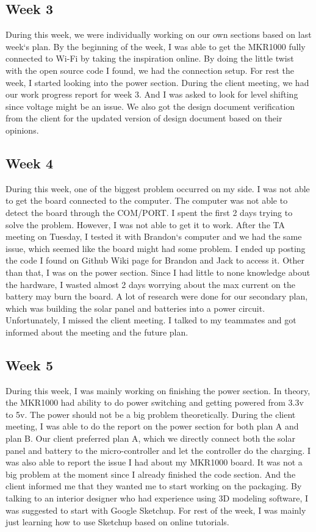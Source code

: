 \documentclass[IEEEtran,letterpaper,10pt,titlepage,fleqn,draftclsnofoot,onecolumn]{article}
\begin{document}
\subsection{Week 3}

During this week, we were individually working on our own sections based on last week`s plan. By the beginning of the week, I was able to get the MKR1000 fully connected to Wi-Fi by taking the inspiration online. By doing the little twist with the open source code I found, we had the connection setup. For rest the week, I started looking into the power section. During the client meeting, we had our work progress report for week 3. And I was asked to look for level shifting since voltage might be an issue.  We also got the design document verification from the client for the updated version of design document based on their opinions.

\subsection{Week 4}

During this week, one of the biggest problem occurred on my side. I was not able to get the board connected to the computer. The computer was not able to detect the board through the COM/PORT. I spent the first 2 days trying to solve the problem. However, I was not able to get it to work. After the TA meeting on Tuesday, I tested it with Brandon`s computer and we had the same issue, which seemed like the board might had some problem. I ended up posting the code I found on Github Wiki page for Brandon and Jack to access it. Other than that, I was on the power section. Since I had little to none knowledge about the hardware, I wasted almost 2 days worrying about the max current on the battery may burn the board. A lot of research were done for our secondary plan, which was building the solar panel and batteries into a power circuit. Unfortunately, I missed the client meeting. I talked to my teammates and got informed about the meeting and the future plan.

\subsection{Week 5}

During this week, I was mainly working on finishing the power section. In theory, the MKR1000 had ability to do power switching and getting powered from 3.3v to 5v. The power should not be a big problem theoretically. During the client meeting, I was able to do the report on the power section for both plan A and plan B. Our client preferred plan A, which we directly connect both the solar panel and battery to the micro-controller and let the controller do the charging. I was also able to report the issue I had about my MKR1000 board. It was not a big problem at the moment since I already finished the code section. And the client informed me that they wanted me to start working on the packaging. By talking to an interior designer who had experience using 3D modeling software, I was suggested to start with Google Sketchup. For rest of the week, I was mainly just learning how to use Sketchup based on online tutorials.
\end{document}
